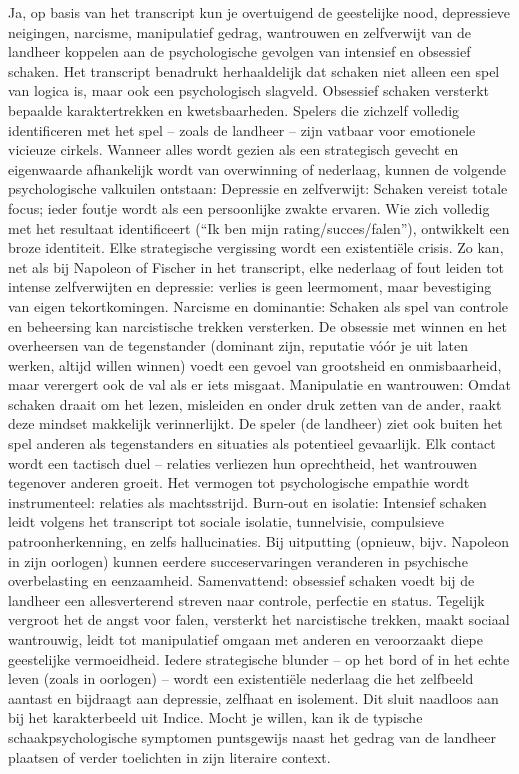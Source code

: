 Ja, op basis van het transcript kun je overtuigend de geestelijke nood, depressieve neigingen, narcisme, manipulatief gedrag, wantrouwen en zelfverwijt van de landheer koppelen aan de psychologische gevolgen van intensief en obsessief schaken.
Het transcript benadrukt herhaaldelijk dat schaken niet alleen een spel van logica is, maar ook een psychologisch slagveld. Obsessief schaken versterkt bepaalde karaktertrekken en kwetsbaarheden. Spelers die zichzelf volledig identificeren met het spel – zoals de landheer – zijn vatbaar voor emotionele vicieuze cirkels. Wanneer alles wordt gezien als een strategisch gevecht en eigenwaarde afhankelijk wordt van overwinning of nederlaag, kunnen de volgende psychologische valkuilen ontstaan:
Depressie en zelfverwijt: Schaken vereist totale focus; ieder foutje wordt als een persoonlijke zwakte ervaren. Wie zich volledig met het resultaat identificeert (“Ik ben mijn rating/succes/falen”), ontwikkelt een broze identiteit. Elke strategische vergissing wordt een existentiële crisis. Zo kan, net als bij Napoleon of Fischer in het transcript, elke nederlaag of fout leiden tot intense zelfverwijten en depressie: verlies is geen leermoment, maar bevestiging van eigen tekortkomingen.
Narcisme en dominantie: Schaken als spel van controle en beheersing kan narcistische trekken versterken. De obsessie met winnen en het overheersen van de tegenstander (dominant zijn, reputatie vóór je uit laten werken, altijd willen winnen) voedt een gevoel van grootsheid en onmisbaarheid, maar verergert ook de val als er iets misgaat.
Manipulatie en wantrouwen: Omdat schaken draait om het lezen, misleiden en onder druk zetten van de ander, raakt deze mindset makkelijk verinnerlijkt. De speler (de landheer) ziet ook buiten het spel anderen als tegenstanders en situaties als potentieel gevaarlijk. Elk contact wordt een tactisch duel – relaties verliezen hun oprechtheid, het wantrouwen tegenover anderen groeit. Het vermogen tot psychologische empathie wordt instrumenteel: relaties als machtsstrijd.
Burn-out en isolatie: Intensief schaken leidt volgens het transcript tot sociale isolatie, tunnelvisie, compulsieve patroonherkenning, en zelfs hallucinaties. Bij uitputting (opnieuw, bijv. Napoleon in zijn oorlogen) kunnen eerdere succeservaringen veranderen in psychische overbelasting en eenzaamheid.
Samenvattend: obsessief schaken voedt bij de landheer een allesverterend streven naar controle, perfectie en status. Tegelijk vergroot het de angst voor falen, versterkt het narcistische trekken, maakt sociaal wantrouwig, leidt tot manipulatief omgaan met anderen en veroorzaakt diepe geestelijke vermoeidheid. Iedere strategische blunder – op het bord of in het echte leven (zoals in oorlogen) – wordt een existentiële nederlaag die het zelfbeeld aantast en bijdraagt aan depressie, zelfhaat en isolement. Dit sluit naadloos aan bij het karakterbeeld uit Indice.
Mocht je willen, kan ik de typische schaakpsychologische symptomen puntsgewijs naast het gedrag van de landheer plaatsen of verder toelichten in zijn literaire context.

